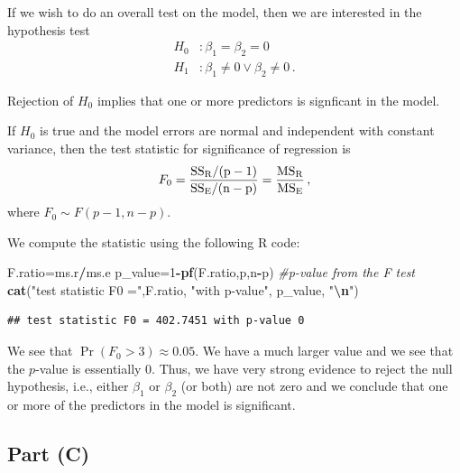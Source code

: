 \documentclass[
]{article}
\newenvironment{Shaded}{\begin{snugshade}}{\end{snugshade}}
\newcommand{\CommentTok}[1]{\textcolor[rgb]{0.56,0.35,0.01}{\textit{#1}}}
\newcommand{\DecValTok}[1]{\textcolor[rgb]{0.00,0.00,0.81}{#1}}
\newcommand{\FunctionTok}[1]{\textcolor[rgb]{0.13,0.29,0.53}{\textbf{#1}}}
\newcommand{\NormalTok}[1]{#1}
\newcommand{\OtherTok}[1]{\textcolor[rgb]{0.56,0.35,0.01}{#1}}
\newcommand{\SpecialCharTok}[1]{\textcolor[rgb]{0.81,0.36,0.00}{\textbf{#1}}}
\newcommand{\StringTok}[1]{\textcolor[rgb]{0.31,0.60,0.02}{#1}}
\begin{document}
If we wish to do an overall test on the model, then we are interested in
the hypothesis test \begin{align*}
   H_0 &\colon \beta_1 = \beta_2 = 0\,\\
   H_1 &\colon \beta_1 \neq 0 \lor \beta_2 \neq 0\,.
\end{align*}

Rejection of \(H_0\) implies that one or more predictors is signficant
in the model.

If \(H_0\) is true and the model errors are normal and independent with
constant variance, then the test statistic for significance of
regression is \begin{equation}
    F_0 = \frac{\rm{SS_R} / (p-1)}{\rm{SS_E}/(n-p)} = \frac{\rm{MS_R}}{\rm{MS_E}}\,,
\end{equation} where \(F_0 \sim F(p-1,n-p)\).

We compute the statistic using the following R code:

\begin{Shaded}
\begin{Highlighting}[]
\NormalTok{F.ratio}\OtherTok{=}\NormalTok{ms.r}\SpecialCharTok{/}\NormalTok{ms.e}
\NormalTok{p\_value}\OtherTok{=}\DecValTok{1}\SpecialCharTok{{-}}\FunctionTok{pf}\NormalTok{(F.ratio,p,n}\SpecialCharTok{{-}}\NormalTok{p) }\CommentTok{\#p{-}value from the F test}
\FunctionTok{cat}\NormalTok{(}\StringTok{"test statistic F0 ="}\NormalTok{,F.ratio, }\StringTok{"with p{-}value"}\NormalTok{, p\_value, }\StringTok{"}\SpecialCharTok{\textbackslash{}n}\StringTok{"}\NormalTok{)}
\end{Highlighting}
\end{Shaded}

\begin{verbatim}
## test statistic F0 = 402.7451 with p-value 0
\end{verbatim}

We see that \(\Pr(F_0 > 3) \approx 0.05\). We have a much larger value
and we see that the \(p\)-value is essentially \(0\). Thus, we have very
strong evidence to reject the null hypothesis, i.e., either \(\beta_1\)
or \(\beta_2\) (or both) are not zero and we conclude that one or more
of the predictors in the model is significant.

\hypertarget{part-c-1}{%
\subsection{Part (C)}\label{part-c-1}}

\end{document}
